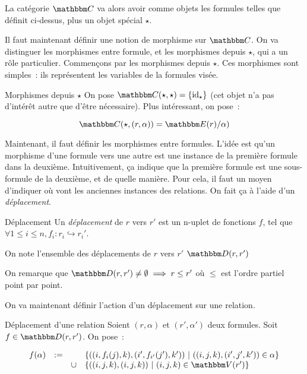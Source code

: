 La catégorie $\C$ va alors avoir comme objets les formules telles que définit ci-dessus,
plus un objet spécial $\star$.

Il faut maintenant définir une notion de morphisme sur $\C$. On va distinguer les
morphismes entre formule, et les morphismes depuis $\star$, qui a un rôle particulier.
Commençons par les morphismes depuis $\star$. Ces morphismes sont simples~: ils 
représentent les variables de la formules visée.

\begin{defi}{Morphismes depuis $\star$}
    On pose $\C(\star,\star) = \{\text{id}_\star\}$ (cet objet n'a pas d'intérêt autre
    que d'être nécessaire). Plus intéressant, on pose~:

    \[\C(\star, (r,\alpha)) = \E(r)/\alpha) \]
\end{defi}

Maintenant, il faut définir les morphismes entre formules. L'idée est qu'un morphisme
d'une formule vers une autre est une instance de la première formule dans la deuxième.
Intuitivement, ça indique que la première formule est une sous-formule de la deuxième,
et de quelle manière. Pour cela, il faut un moyen d'indiquer où vont les anciennes
instances des relations. On fait ça à l'aide d'un \emph{déplacement}.

\begin{defi}{Déplacement}
    Un \emph{déplacement} de $r$ vers $r'$ est un n-uplet de fonctions $f$, tel que
    $\forall 1\leq i\leq n, f_i : r_i\hookrightarrow r_i'$.

    On note l'ensemble des déplacements de $r$ vers $r'$ $\D(r,r')$
\end{defi}

\begin{rem}
    On remarque que $\D(r,r')\neq\emptyset\implies r\leq r'$ où $\leq$ est l'ordre
    partiel point par point.
\end{rem}

On va maintenant définir l'action d'un déplacement sur une relation.

\begin{defi}{Déplacement d'une relation}
    Soient $(r,\alpha)$ et $(r',\alpha')$ deux formules. Soit $f\in\D(r,r')$. On pose~:

    \[ \begin{array}{rccl}
          f(\alpha) &:= & & \{ ((i,f_i(j), k), (i', f_{i'}(j'), k'))
                              ~|~ ((i,j,k), (i',j',k'))\in \alpha \} \\
                    &   & \cup &\{ ((i,j,k), (i,j,k)) ~|~ (i,j,k)\in\V(r') \} \\
    \end{array} \]
\end{defi}

